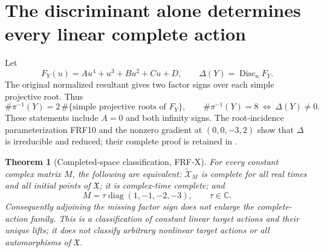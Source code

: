 \documentclass[11pt]{article}
\newtheorem{theorem}{Theorem}
\newcommand{\C}{\mathbb C}
\newcommand{\diag}{\operatorname{diag}}
\begin{document}
\section{The discriminant alone determines every linear complete action}
Let
\[
 F_Y(u)=Au^4+u^3+Bu^2+Cu+D,\qquad \Delta(Y)=\operatorname{Disc}_uF_Y.
\]
The original normalized resultant gives two factor signs over each simple
projective root. Thus
\[
 \#\pi^{-1}(Y)=2\,\#\{\text{simple projective roots of }F_Y\},
 \qquad \#\pi^{-1}(Y)=8\ \Longleftrightarrow\ \Delta(Y)\ne0.
 \tag{FRFX7}
\]
These statements include $A=0$ and both infinity signs. The root-incidence
parameterization FRF10 and the nonzero gradient at $(0,0,-3,2)$ show that
$\Delta$ is irreducible and reduced; their complete proof is retained in
\cite[Theorem FRF-C]{FRF}.

\begin{theorem}[Completed-space classification, FRF-X]
For every constant complex matrix $M$, the following are equivalent:
$\widetilde{\mathcal X}_M$ is complete for all real times and all initial
points of $\mathfrak X$; it is complex-time complete; and
\[
 \boxed{M=\tau\diag(1,-1,-2,-3),\qquad\tau\in\C.}\tag{FRFX8}
\]
Consequently adjoining the missing factor sign does not enlarge the
complete-action family. This is a classification of constant linear target
actions and their unique lifts; it does not classify arbitrary nonlinear
target actions or all automorphisms of $\mathfrak X$.
\end{theorem}
\end{document}
